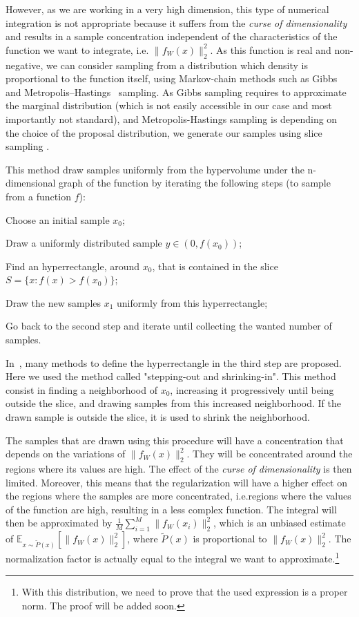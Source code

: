 \documentclass{article}
\begin{document}
However, as we are working in a very high dimension, this type of numerical integration is not appropriate because it suffers from the \textit{curse of dimensionality} and results in a sample concentration independent of the characteristics of the function we want to integrate, i.e. $\| f_W(x)\|_2^2$. As this function is real and non-negative, we can consider sampling from a distribution which density is proportional to the function itself, using Markov-chain methods such as Gibbs~\cite{casella1992explaining}  and Metropolis–Hastings~\cite{hastings1970monte} sampling. As Gibbs sampling requires to approximate the marginal distribution (which is not easily accessible in our case and most importantly not standard), and Metropolis-Hastings sampling is depending on the choice of the proposal distribution, we generate our samples using slice sampling \cite{neal2003}.


This method draw samples uniformly from the hypervolume under the n-dimensional graph  of the function by iterating the following steps (to sample from a function $f$):
\begin{inparaenum}[(i)]
\item Choose an initial sample $x_0$;
\item Draw a uniformly distributed sample $y \in (0, f(x_0))$;
\item Find an hyperrectangle, around $x_0$, that is contained in the slice $S =\lbrace x : f(x)>f(x_0)\rbrace$;
\item Draw the new samples $x_1$ uniformly from this hyperrectangle;
\item Go back to the second step and iterate until collecting the wanted number of samples.
\end{inparaenum}
In~\cite{neal2003}, many methods to define the hyperrectangle in the third step are proposed. Here we used the method called "stepping-out and shrinking-in". This method consist in finding a neighborhood of $x_0$, increasing it progressively until being outside the slice, and drawing samples from this increased neighborhood. If the drawn sample is outside the slice, it is used to shrink the neighborhood. 


The samples that are drawn using this procedure will have a concentration that depends on the variations of $\| f_W(x)\|_2^2$. They will be concentrated around the regions where its values are high. The effect of the \textit{curse of dimensionality} is then limited. Moreover, this means that the regularization will have a higher effect on the regions where the samples are more concentrated, i.e.\the regions where the values of the function are high, resulting in a less complex function. The integral will then be approximated by
$\frac{1}{M}\sum_{i=1}^M \| f_W(x_i)\|_2^2$,
which is an unbiased estimate of
$\mathbb{E}_{x\sim \tilde{P}(x)}[\| f_W(x)\|_2^2]$,
where $\tilde{P}(x)$ is proportional to $\| f_W(x)\|_2^2$. The normalization factor is actually equal to the integral we want to approximate.\footnote{With this distribution, we need to prove that the used expression is a proper norm. The proof will be added soon.}
\end{document}
